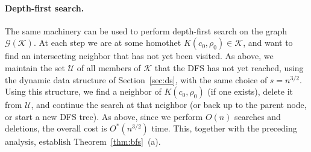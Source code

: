 \documentclass[11pt]{article}
\newif\ifsocgproc
\def\G{\mathcal{G}}
\def\K{\mathcal{K}}
\def\U{\mathcal{U}}
\theoremstyle{definition}
\begin{document}
\paragraph{Depth-first search.}
\fi
The same machinery can be used to perform depth-first search on the graph $\G(\K)$.
At each step we are at some homothet $K(c_0,\rho_0)\in\K$, and want to find an intersecting neighbor 
that has not yet been visited. As above, we maintain the set $\U$ of all members of $\K$ that 
the DFS has not yet reached, using the dynamic data structure of Section~\ref{sec:ds}, with the
same choice of $s=n^{3/2}$. Using this structure, we find a neighbor of $K(c_0,\rho_0)$
(if one exists), delete it from $\U$, and continue the search at that neighbor (or back up
to the parent node, or start a new DFS tree). As above, since we perform
$O(n)$ searches and deletions, the overall cost is $O^*(n^{3/2})$ time. 
This, together with the preceding analysis, establish Theorem~\ref{thm:bfs}~(a).
%
\end{document}
